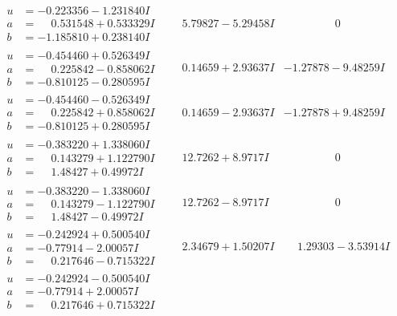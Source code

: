 \documentclass[1p]{elsarticle_modified}
\theoremstyle{definition}
\begin{document}
$$\begin{array}{c|c|c}
\begin{aligned}
u &= -0.223356 - 1.231840 I \\
a &= \phantom{-}0.531548 + 0.533329 I \\
b &= -1.185810 + 0.238140 I\end{aligned}
 & \phantom{-}5.79827 - 5.29458 I & \phantom{-0.000000 } 0 \\ \hline\begin{aligned}
u &= -0.454460 + 0.526349 I \\
a &= \phantom{-}0.225842 - 0.858062 I \\
b &= -0.810125 - 0.280595 I\end{aligned}
 & \phantom{-}0.14659 + 2.93637 I & -1.27878 - 9.48259 I \\ \hline\begin{aligned}
u &= -0.454460 - 0.526349 I \\
a &= \phantom{-}0.225842 + 0.858062 I \\
b &= -0.810125 + 0.280595 I\end{aligned}
 & \phantom{-}0.14659 - 2.93637 I & -1.27878 + 9.48259 I \\ \hline\begin{aligned}
u &= -0.383220 + 1.338060 I \\
a &= \phantom{-}0.143279 + 1.122790 I \\
b &= \phantom{-}1.48427 + 0.49972 I\end{aligned}
 & \phantom{-}12.7262 + 8.9717 I & \phantom{-0.000000 } 0 \\ \hline\begin{aligned}
u &= -0.383220 - 1.338060 I \\
a &= \phantom{-}0.143279 - 1.122790 I \\
b &= \phantom{-}1.48427 - 0.49972 I\end{aligned}
 & \phantom{-}12.7262 - 8.9717 I & \phantom{-0.000000 } 0 \\ \hline\begin{aligned}
u &= -0.242924 + 0.500540 I \\
a &= -0.77914 - 2.00057 I \\
b &= \phantom{-}0.217646 - 0.715322 I\end{aligned}
 & \phantom{-}2.34679 + 1.50207 I & \phantom{-}1.29303 - 3.53914 I \\ \hline\begin{aligned}
u &= -0.242924 - 0.500540 I \\
a &= -0.77914 + 2.00057 I \\
b &= \phantom{-}0.217646 + 0.715322 I\end{aligned}

\end{array}$$
\end{document}
